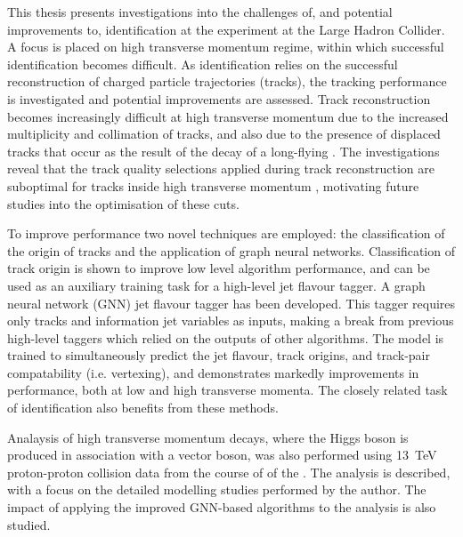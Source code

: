 
This thesis presents investigations into the challenges of, and potential improvements to, \bjet identification at the \ATLAS experiment at the Large Hadron Collider.
A focus is placed on high transverse momentum regime, within which successful \bjet identification becomes difficult.
As \bjet identification relies on the successful reconstruction of charged particle trajectories (tracks), the tracking performance is investigated and potential improvements are assessed.
Track reconstruction becomes increasingly difficult at high transverse momentum due to the increased multiplicity and collimation of tracks, and also due to the presence of displaced tracks that occur as the result of the decay of a long-flying \bhadron.
The investigations reveal that the track quality selections applied during track reconstruction are suboptimal for tracks inside high transverse momentum \bjets, motivating future studies into the optimisation of these cuts.

To improve \btagging performance two novel techniques are employed: the classification of the origin of tracks and the application of graph neural networks.
Classification of track origin is shown to improve low level algorithm performance, and can be used as an auxiliary training task for a high-level jet flavour tagger.
A graph neural network (GNN) jet flavour tagger has been developed.
This tagger requires only tracks and information jet variables as inputs, making a break from previous high-level taggers which relied on the outputs of other algorithms.
The model is trained to simultaneously predict the jet flavour, track origins, and track-pair compatability (i.e. vertexing), and demonstrates markedly improvements in \btagging performance, both at low and high transverse momenta. 
The closely related task of \cjet identification also benefits from these methods.

Analaysis of high transverse momentum \Hbb decays, where the Higgs boson is produced in association with a vector boson, was also performed using \SI{13}{\TeV} proton-proton collision data from the course of \runtwo of the \LHC.
The analysis is described, with a focus on the detailed modelling studies performed by the author.
The impact of applying the improved GNN-based \btagging algorithms to the analysis is also studied.
